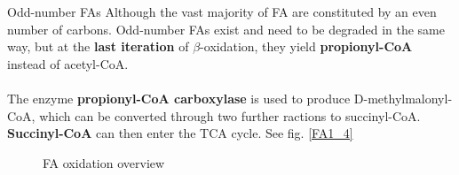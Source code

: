 \documentclass[../main.tex]{subfiles}
\begin{document}
\begin{RemarkWithTitel}{Odd-number FAs}
	Although the vast majority of FA are constituted by an even number of carbons. Odd-number FAs exist and need to be degraded in the same way, but at the \textbf{last iteration} of $\beta$-oxidation, they yield \textbf{propionyl-CoA} instead of acetyl-CoA.\\
	\\
	The enzyme \textbf{propionyl-CoA carboxylase} is used to produce D-methylmalonyl-CoA, which can be converted through two further ractions to succinyl-CoA. \textbf{Succinyl-CoA} can then enter the TCA cycle. See fig. \ref{FA1_4}

\end{RemarkWithTitel}

\begin{figure}[H]
	\centering
	\hfil
	\caption{FA oxidation overview}
\end{figure}
\end{document}
